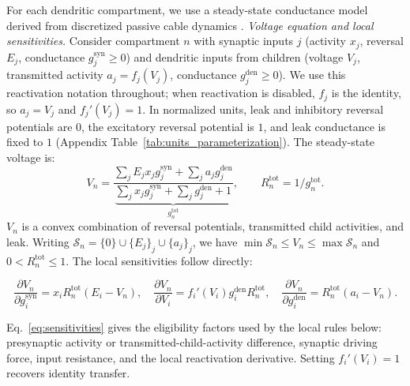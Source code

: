     For each dendritic compartment, we use a steady-state conductance model derived from discretized passive cable dynamics \cite{koch1999biophysics,dayan2001theoretical}.
    \noindent\emph{Voltage equation and local sensitivities.}
    Consider compartment $n$ with synaptic inputs $j$ (activity $x_j$, reversal $E_j$, conductance $g_j^{\mathrm{syn}}\!\geq\!0$) and dendritic inputs from children (voltage $V_j$, transmitted activity $a_j=f_j(V_j)$, conductance $g_j^{\mathrm{den}}\!\geq\!0$). We use this reactivation notation throughout; when reactivation is disabled, $f_j$ is the identity, so $a_j=V_j$ and $f_j'(V_j)=1$.
    In normalized units, leak and inhibitory reversal potentials are $0$, the excitatory reversal potential is $1$, and leak conductance is fixed to $1$ (Appendix Table~\ref{tab:units_parameterization}). The steady-state voltage is:
    \begin{equation}
    V_n = \frac{\sum_j E_j x_j g_j^{\mathrm{syn}} + \sum_j a_j g_j^{\mathrm{den}}}{\underbrace{\sum_j x_j g_j^{\mathrm{syn}} + \sum_j g_j^{\mathrm{den}} + 1}_{g_n^{\mathrm{tot}}}},
    \qquad R_n^{\mathrm{tot}} = 1/g_n^{\mathrm{tot}}.
    \label{eq:voltage}
    \end{equation}
    $V_n$ is a convex combination of reversal potentials, transmitted child activities, and leak. Writing $\mathcal{S}_n = \{0\} \cup \{E_j\}_j \cup \{a_j\}_j$, we have $\min\mathcal{S}_n \leq V_n \leq \max\mathcal{S}_n$ and $0 < R_n^{\mathrm{tot}} \leq 1$.
    The local sensitivities follow directly:
    
    \begin{proposition}
    \label{prop:sensitivities}
    \begin{equation}
    \frac{\partial V_n}{\partial g_i^{\mathrm{syn}}} = x_i R_n^{\mathrm{tot}} (E_i - V_n),
    \quad
    \frac{\partial V_n}{\partial V_i} = f_i'(V_i)g_i^{\mathrm{den}} R_n^{\mathrm{tot}},
    \quad
    \frac{\partial V_n}{\partial g_i^{\mathrm{den}}} = R_n^{\mathrm{tot}} (a_i - V_n).
    \label{eq:sensitivities}
    \end{equation}
    \end{proposition}
    Eq.~\eqref{eq:sensitivities} gives the eligibility factors used by the local rules below: presynaptic activity or transmitted-child-activity difference, synaptic driving force, input resistance, and the local reactivation derivative. Setting $f_i'(V_i)=1$ recovers identity transfer.

